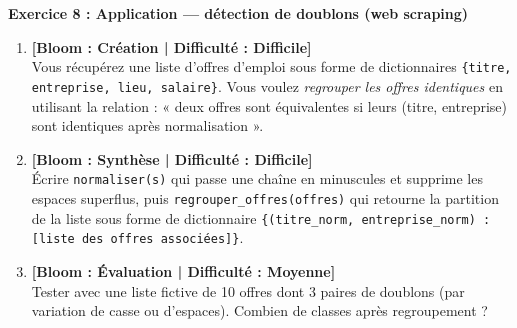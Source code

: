 \documentclass[12pt,a4paper]{report}
\begin{document}
\noindent\textbf{Exercice 8 : Application --- détection de doublons (web scraping)}
\begin{enumerate}
    \item \textbf{[Bloom : Création | Difficulté : Difficile]} \\
    Vous récupérez une liste d'offres d'emploi sous forme de dictionnaires \texttt{\{titre, entreprise, lieu, salaire\}}. Vous voulez \emph{regrouper les offres identiques} en utilisant la relation : « deux offres sont équivalentes si leurs (titre, entreprise) sont identiques après normalisation ».
    \item \textbf{[Bloom : Synthèse | Difficulté : Difficile]} \\
    Écrire \texttt{normaliser(s)} qui passe une chaîne en minuscules et supprime les espaces superflus, puis \texttt{regrouper\_offres(offres)} qui retourne la partition de la liste sous forme de dictionnaire \texttt{\{(titre\_norm, entreprise\_norm) : [liste des offres associées]\}}.
    \item \textbf{[Bloom : Évaluation | Difficulté : Moyenne]} \\
    Tester avec une liste fictive de 10 offres dont 3 paires de doublons (par variation de casse ou d'espaces). Combien de classes après regroupement ?
\end{enumerate}
\end{document}
